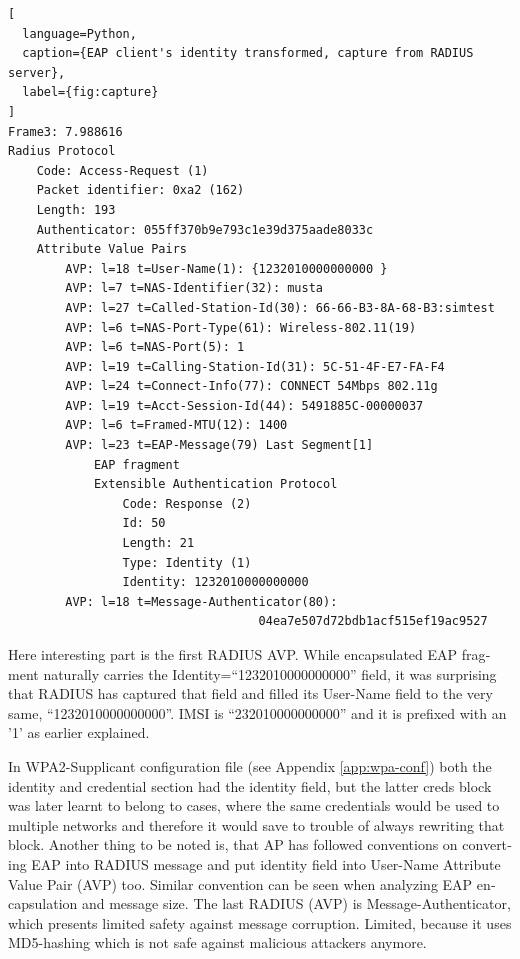 \documentclass[12pt,a4paper,english]{tutthesis}
\begin{document}
\begin{otherlanguage}{english}
\renewcommand{\lstlistingname}{Capture}
\begin{lstlisting}[
  language=Python,
  caption={EAP client's identity transformed, capture from RADIUS server},
  label={fig:capture}
]
Frame3: 7.988616
Radius Protocol
    Code: Access-Request (1)
    Packet identifier: 0xa2 (162)
    Length: 193
    Authenticator: 055ff370b9e793c1e39d375aade8033c
    Attribute Value Pairs
        AVP: l=18 t=User-Name(1): {1232010000000000 }
        AVP: l=7 t=NAS-Identifier(32): musta
        AVP: l=27 t=Called-Station-Id(30): 66-66-B3-8A-68-B3:simtest
        AVP: l=6 t=NAS-Port-Type(61): Wireless-802.11(19)
        AVP: l=6 t=NAS-Port(5): 1
        AVP: l=19 t=Calling-Station-Id(31): 5C-51-4F-E7-FA-F4
        AVP: l=24 t=Connect-Info(77): CONNECT 54Mbps 802.11g
        AVP: l=19 t=Acct-Session-Id(44): 5491885C-00000037
        AVP: l=6 t=Framed-MTU(12): 1400
        AVP: l=23 t=EAP-Message(79) Last Segment[1]
            EAP fragment
            Extensible Authentication Protocol
                Code: Response (2)
                Id: 50
                Length: 21
                Type: Identity (1)
                Identity: 1232010000000000
        AVP: l=18 t=Message-Authenticator(80):
                                   04ea7e507d72bdb1acf515ef19ac9527
\end{lstlisting}
\normalsize


Here interesting part is the first RADIUS AVP.
While encapsulated EAP fragment naturally carries the Identity=``1232010000000000''
field, it was surprising that RADIUS has captured that field and 
filled its User-Name field to the very same, ``1232010000000000''. 
IMSI is ``232010000000000'' and it is prefixed with
an '1' as earlier explained.

In WPA2-Supplicant configuration file (see Appendix \ref{app:wpa-conf}) both the identity and
credential section had the identity field, but the latter creds block
was later learnt to belong to cases, where the same credentials would
be used to multiple networks and therefore it would save to trouble of
always rewriting that block.
Another thing to be noted is, that AP has followed conventions on
converting EAP into RADIUS message and put identity field into
User-Name Attribute Value Pair (AVP) too.
Similar convention can be seen when analyzing EAP encapsulation and
message size. The last RADIUS (AVP) is 
Message-Authenticator, which presents limited safety against message 
corruption. Limited, because it uses MD5-hashing which is not safe
against malicious attackers anymore.


\end{otherlanguage}
\end{document}
